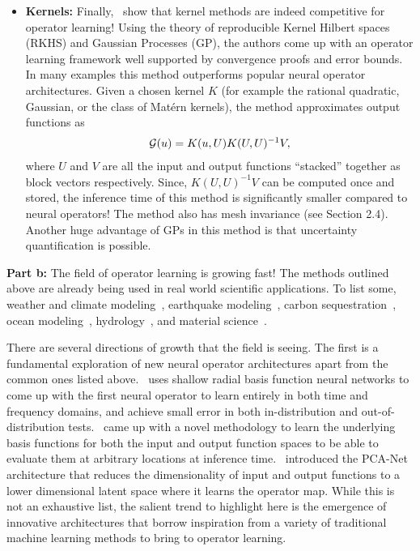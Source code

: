 \begin{itemize}
\item {\bf Kernels:} Finally,~\citep{batlle2024kernel} show that kernel methods are indeed competitive for operator learning! Using the theory of reproducible Kernel Hilbert spaces (RKHS) and Gaussian Processes (GP), the authors come up with an operator learning framework well supported by convergence proofs and error bounds. In many examples this method outperforms popular neural operator architectures. Given a chosen kernel $K$ (for example the rational quadratic, Gaussian, or the class of Mat\'ern kernels), the method approximates output functions as
\begin{align}
\mathcal{G}(u) = K(u, U) K(U, U)^{-1} V,
\end{align}
where $U$ and $V$ are all the input and output functions ``stacked'' together as block vectors respectively. Since, $K(U, U)^{-1} V$ can be computed once and stored, the inference time of this method is significantly smaller compared to neural operators! The method also has mesh invariance (see Section 2.4). Another huge advantage of GPs in this method is that uncertainty quantification is possible.
\end{itemize}

{\bf Part b:} The field of operator learning is growing fast! The methods outlined above are already being used in real world scientific applications. To list some, weather and climate modeling~\citep{bora2023learning, pathak2022fourcastnet, jiang2023efficient, yang2024fourier}, earthquake modeling~\citep{haghighat2024deeponet}, carbon sequestration~\citep{lee2024efficient}, ocean modeling~\citep{choi2024applications}, hydrology~\citep{sun2024bridging}, and material science~\citep{gupta2022towards, oommen2024rethinking}.

There are several directions of growth that the field is seeing. The first is a fundamental exploration of new neural operator architectures apart from the common ones listed above.~\citep{kurz2024radial} uses shallow radial basis function neural networks to come up with the first neural operator to learn entirely in both time and frequency domains, and achieve small error in both in-distribution and out-of-distribution tests.~\citep{ingebrand2025basis} came up with a novel methodology to learn the underlying basis functions for both the input and output function spaces to be able to evaluate them at arbitrary locations at inference time.~\citep{bhattacharya2021model} introduced the PCA-Net architecture that reduces the dimensionality of input and output functions to a lower dimensional latent space where it learns the operator map. While this is not an exhaustive list, the salient trend to highlight here is the emergence of innovative architectures that borrow inspiration from a variety of traditional machine learning methods to bring to operator learning.

